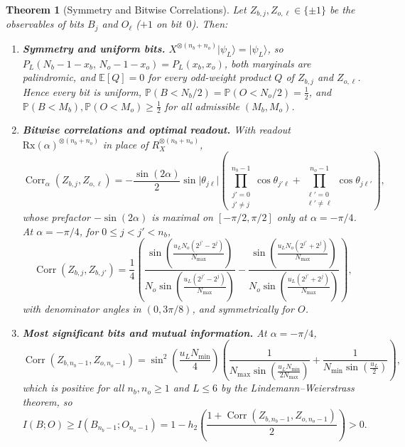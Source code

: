 \documentclass[11pt,a4paper]{article}
\theoremstyle{plain}
\newtheorem{theorem}{Theorem}[section]
\theoremstyle{definition}
\theoremstyle{remark}
\newcommand{\Prob}{\mathbb{P}}
\newcommand{\Exp}{\mathbb{E}}
\newcommand{\Corr}{\operatorname{Corr}}
\newcommand{\ket}[1]{\lvert#1\rangle}
\begin{document}
\begin{theorem}[Symmetry and Bitwise Correlations]\label{thm:bitwise-corr}
  Let \( Z_{b,j}, Z_{o,\ell} \in \{\pm 1\} \) be the observables of bits \( B_j \) and
  \( O_\ell \) (\( +1 \) on bit~\( 0 \)). Then:
  \begin{enumerate}
    \item \textbf{Symmetry and uniform bits.} \( X^{\otimes(n_b + n_o)}\ket{\psi_L} = \ket{\psi_L} \),
      so \( P_L(N_b - 1 - x_b,\, N_o - 1 - x_o) = P_L(x_b, x_o) \), both marginals are
      palindromic, and \( \Exp[Q] = 0 \) for every odd-weight product \( Q \) of \( Z_{b,j} \)
      and \( Z_{o,\ell} \). Hence every bit is uniform, \( \Prob(B < N_b / 2) = \Prob(O < N_o / 2)
      = \frac{1}{2} \), and \( \Prob(B < M_b), \Prob(O < M_o) \ge \frac{1}{2} \) for all admissible
      \( (M_b, M_o) \).
    \item \textbf{Bitwise correlations and optimal readout.} With readout
      \( {\mathrm{Rx}(\alpha)}^{\otimes(n_b + n_o)} \) in place of \( R_X^{\otimes(n_b + n_o)} \),
      \begin{equation}\label{eq:bitwise-corr}
        \Corr_\alpha(Z_{b,j}, Z_{o,\ell}) = -\frac{\sin(2\alpha)}{2}\sin\lvert\theta_{j\ell}\rvert
        \left(\prod_{\substack{j'=0 \\ j' \neq j}}^{n_b - 1} \cos\theta_{j'\ell} +
        \prod_{\substack{\ell'=0 \\ \ell' \neq \ell}}^{n_o - 1} \cos\theta_{j\ell'}\right),
      \end{equation}
      whose prefactor \( -\sin(2\alpha) \) is maximal on \( [-\pi / 2, \pi / 2] \) only at
      \( \alpha = -\pi / 4 \). At \( \alpha = -\pi / 4 \), for \( 0 \le j < j' < n_b \),
      \begin{equation}\label{eq:intra-corr}
        \Corr(Z_{b,j}, Z_{b,j'}) = \frac{1}{4}\left(
          \frac{\sin\left(\frac{u_L N_o (2^{j'} - 2^j)}{N_{\max}}\right)}%
               {N_o \sin\left(\frac{u_L (2^{j'} - 2^j)}{N_{\max}}\right)} -
          \frac{\sin\left(\frac{u_L N_o (2^{j'} + 2^j)}{N_{\max}}\right)}%
               {N_o \sin\left(\frac{u_L (2^{j'} + 2^j)}{N_{\max}}\right)}
        \right),
      \end{equation}
      with denominator angles in \( (0, 3\pi / 8) \), and symmetrically for \( O \).
    \item \textbf{Most significant bits and mutual information.} At \( \alpha = -\pi / 4 \),
      \begin{equation}\label{eq:msb-corr}
        \Corr(Z_{b, n_b - 1}, Z_{o, n_o - 1}) =
        \sin^2\left(\frac{u_L N_{\min}}{4}\right)
        \left(\frac{1}{N_{\max}\sin\left(\frac{u_L N_{\min}}{2 N_{\max}}\right)} +
        \frac{1}{N_{\min}\sin\left(\frac{u_L}{2}\right)}\right),
      \end{equation}
      which is positive for all \( n_b, n_o \ge 1 \) and \( L \le 6 \) by the
      Lindemann--Weierstrass theorem, so
      \begin{equation}\label{eq:mi-lower}
        I(B; O) \ge I(B_{n_b - 1}; O_{n_o - 1}) =
        1 - h_2\left(\frac{1 + \Corr(Z_{b, n_b - 1}, Z_{o, n_o - 1})}{2}\right) > 0.
      \end{equation}
  \end{enumerate}
\end{theorem}
\end{document}
